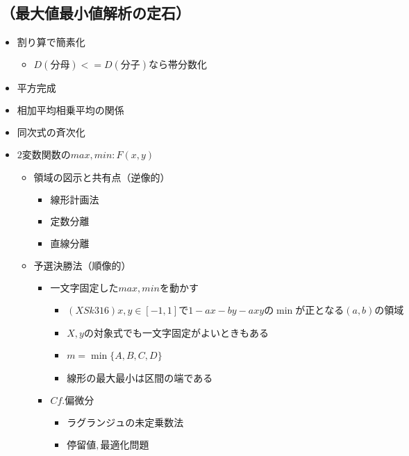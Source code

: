 \documentclass[dvipdfmx,uplatex]{jsarticle}
\begin{document}
\subsection{（最大値最小値解析の定石）}
\begin{itemize}
	\item $ 割り算で簡素化$
	\begin{itemize}
		\item $ D(分母) <= D(分子) なら帯分数化$
	\end{itemize}
	\item $ 平方完成$
	\item $ 相加平均相乗平均の関係$
	\item $ 同次式の斉次化$
	\item $ 2変数関数のmax,min: F(x,y)$
	\begin{itemize}
		\item $ 領域の図示と共有点（逆像的）$
		\begin{itemize}
			\item $ 線形計画法$
			\item $ 定数分離$
			\item $ 直線分離$
		\end{itemize}
		\item $ 予選決勝法（順像的）$
		\begin{itemize}
			\item $ 一文字固定したmax,minを動かす$
			\begin{itemize}
				\item $ (XSk316) x,y \in [-1,1]で 1-ax-by-axy の \min が正となる(a,b)の領域$
				\item $ X,yの対象式でも一文字固定がよいときもある$
				\item $ m = \min\{A, B, C, D\}$
				\item $ 線形の最大最小は区間の端である$
			\end{itemize}
			\item $ Cf. 偏微分$
			\begin{itemize}
				\item $ ラグランジュの未定乗数法$
				\item $ 停留値,最適化問題$
			\end{itemize}
		\end{itemize}
	\end{itemize}
\end{itemize}
\end{document}
